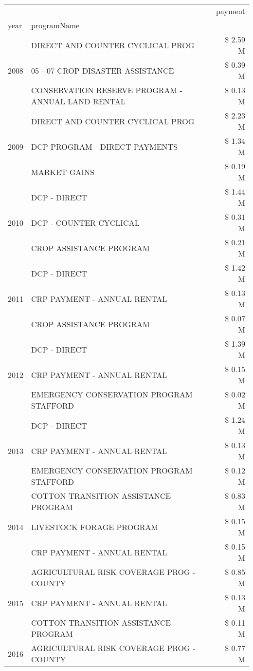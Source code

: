 \begin{tabular}{llr}
\toprule
 &  & payment \\
year & programName &  \\
\midrule
\multirow[t]{3}{*}{2008} & DIRECT AND COUNTER CYCLICAL PROG & \$ 2.59 M \\
 & 05 - 07 CROP DISASTER ASSISTANCE & \$ 0.39 M \\
 & CONSERVATION RESERVE PROGRAM - ANNUAL LAND RENTAL & \$ 0.13 M \\
\cline{1-3}
\multirow[t]{3}{*}{2009} & DIRECT AND COUNTER CYCLICAL PROG & \$ 2.23 M \\
 & DCP PROGRAM - DIRECT PAYMENTS & \$ 1.34 M \\
 & MARKET GAINS & \$ 0.19 M \\
\cline{1-3}
\multirow[t]{3}{*}{2010} & DCP - DIRECT & \$ 1.44 M \\
 & DCP - COUNTER CYCLICAL & \$ 0.31 M \\
 & CROP ASSISTANCE PROGRAM & \$ 0.21 M \\
\cline{1-3}
\multirow[t]{3}{*}{2011} & DCP - DIRECT & \$ 1.42 M \\
 & CRP PAYMENT - ANNUAL RENTAL & \$ 0.13 M \\
 & CROP ASSISTANCE PROGRAM & \$ 0.07 M \\
\cline{1-3}
\multirow[t]{3}{*}{2012} & DCP - DIRECT & \$ 1.39 M \\
 & CRP PAYMENT - ANNUAL RENTAL & \$ 0.15 M \\
 & EMERGENCY CONSERVATION PROGRAM STAFFORD & \$ 0.02 M \\
\cline{1-3}
\multirow[t]{3}{*}{2013} & DCP - DIRECT & \$ 1.24 M \\
 & CRP PAYMENT - ANNUAL RENTAL & \$ 0.13 M \\
 & EMERGENCY CONSERVATION PROGRAM STAFFORD & \$ 0.12 M \\
\cline{1-3}
\multirow[t]{3}{*}{2014} & COTTON TRANSITION ASSISTANCE PROGRAM & \$ 0.83 M \\
 & LIVESTOCK FORAGE PROGRAM & \$ 0.15 M \\
 & CRP PAYMENT - ANNUAL RENTAL & \$ 0.15 M \\
\cline{1-3}
\multirow[t]{3}{*}{2015} & AGRICULTURAL RISK COVERAGE PROG - COUNTY & \$ 0.85 M \\
 & CRP PAYMENT - ANNUAL RENTAL & \$ 0.13 M \\
 & COTTON TRANSITION ASSISTANCE PROGRAM & \$ 0.11 M \\
\cline{1-3}
\multirow[t]{3}{*}{2016} & AGRICULTURAL RISK COVERAGE PROG - COUNTY & \$ 0.77 M \\

\end{tabular}

